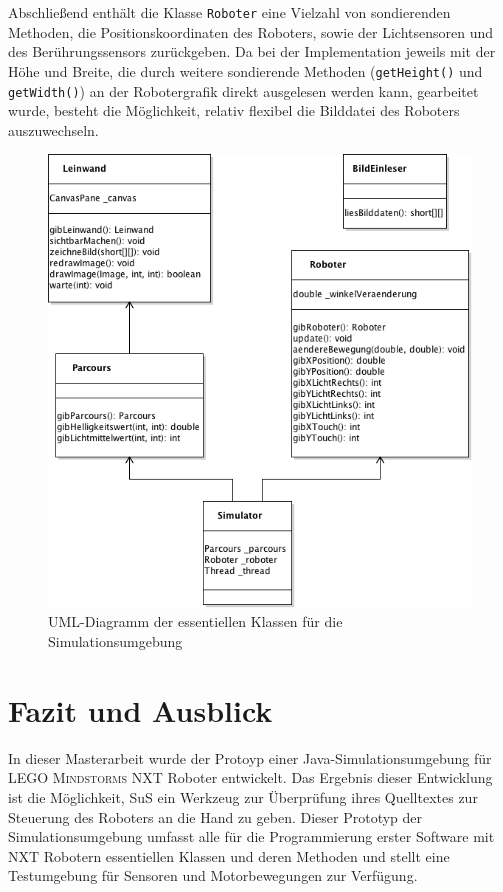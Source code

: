 \documentclass[paper=a4, pagesize, DIV=calc, BCOR=15mm, twoside=on, onecolumn=on, open = right, titlepage =on, parskip =half-, headsepline = on, footsepline = on, chapterprefix = on, appendixprefix = off, fontsize = 12pt, numbers = noenddot, abstract = on]{scrbook}
\numberwithin{equation}{chapter}
\theoremstyle{definition}
\theoremstyle{plain}
\theoremstyle{plain}
\theoremstyle{remark}
\theoremstyle{plain}
\theoremstyle{plain}
\begin{document}
Abschließend enthält die Klasse \texttt{Roboter} eine Vielzahl von sondierenden Methoden, die Positionskoordinaten des Roboters, sowie der Lichtsensoren und des Berührungssensors zurückgeben. Da bei der Implementation jeweils mit der Höhe und Breite, die durch weitere sondierende Methoden (\texttt{getHeight()} und \texttt{getWidth()}) an der Robotergrafik direkt ausgelesen werden kann, gearbeitet wurde, besteht die Möglichkeit, relativ flexibel die Bilddatei des Roboters auszuwechseln.

\begin{figure}[htbp]
\centering
\includegraphics[scale=0.7]{images/uml_simulator_essenz.png}
\caption{UML-Diagramm der essentiellen Klassen für die Simulationsumgebung}
\label{fig:simulator_uml}
\end{figure}


\newpage
\chapter{Fazit und Ausblick}

\onehalfspacing

In dieser Masterarbeit wurde der Protoyp einer Java-Simulationsumgebung für \textsc{LEGO Mindstorms} NXT Roboter entwickelt. Das Ergebnis dieser Entwicklung ist die Möglichkeit, SuS ein Werkzeug zur Überprüfung ihres Quelltextes zur Steuerung des Roboters an die Hand
zu geben. Dieser Prototyp der Simulationsumgebung umfasst alle für die
Programmierung erster Software mit NXT Robotern essentiellen Klassen und deren Methoden und stellt eine Testumgebung für Sensoren und Motorbewegungen zur Verfügung.
\end{document}

